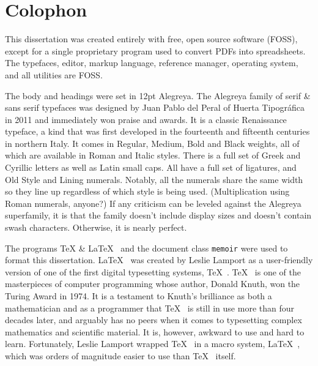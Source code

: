 
\chapter{Colophon}\indent\small\OnehalfSpacing%

This dissertation was created entirely with free, open source software (FOSS), except for a single proprietary program used to convert PDFs into spreadsheets. The typefaces, editor, markup language, reference manager, operating system, and all utilities are FOSS. 
\begin{center}
  \textbf{\qquad{}\qquad{}\qquad{}\qquad{}}
\end{center}
The body and headings were set in 12pt Alegreya. The Alegreya family of serif \& sans serif typefaces was designed by Juan Pablo del Peral of Huerta Tipográfica in 2011 and immediately won praise and awards. It is a classic Renaissance typeface, a kind that was first developed in the fourteenth and fifteenth centuries in northern Italy. It comes in Regular, Medium, Bold and Black weights, all of which are available in Roman and Italic styles. There is a full set of Greek and Cyrillic letters as well as Latin small caps. All have a full set of ligatures, and Old Style and Lining numerals. Notably, all the numerals share the same width so they line up regardless of which style is being used. (Multiplication using Roman numerals, anyone?) If any criticism can be leveled against the Alegreya superfamily, it is that the family doesn't include display sizes and doesn't contain swash characters. Otherwise, it is nearly perfect.
\begin{center}
  \textbf{\quad\quad{}\quad\quad{}\quad\quad{}\quad\quad{}}
\end{center}
The programs \TeX{} \& \LaTeX{}  and the document class \texttt{memoir} were used to format this dissertation. \LaTeX  was created by Leslie Lamport as a user-friendly version of one of the first digital typesetting systems, \TeX . \TeX  is one of the masterpieces of computer programming whose author, Donald Knuth, won the Turing Award in 1974. It is a testament to Knuth's brilliance as both a mathematician and as a programmer that \TeX  is still in use more than four decades later, and arguably has no peers when it comes to typesetting complex mathematics and scientific material. It is, however, awkward to use and hard to learn. Fortunately, Leslie Lamport wrapped \TeX  in a macro system, \LaTeX , which was orders of magnitude easier to use than \TeX  itself.

